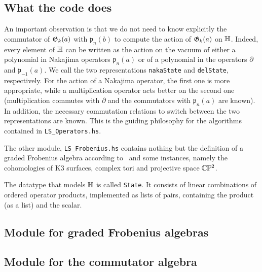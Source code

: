 \subsection{What the code does}
An important observation is that we do not need to know explicitly the commutator of $\mathfrak{G}_k(a)$ with $\mathfrak p_n(b)$ to compute the action of $\mathfrak{G}_k(a)$ on $\mathbb{H}$. 
Indeed, every element of $\mathbb{H}$ can be written as the action on the vacuum of either a polynomial in Nakajima operators $\mathfrak p_n(a)$ or of a polynomial in the operators $\partial$ and $\mathfrak p_{-1}(a)$. We call the two representations \verb|nakaState| and \verb|delState|, respectively. For the action of a Nakajima operator, the first one is more appropriate, while a multiplication operator acts better on the second one (multiplication commutes with $\partial$ and the commutators with $\mathfrak p_n(a)$ are known). 
In addition, the necessary commutation relations to switch between the two representations are known. This is the guiding philosophy for the algorithms contained in \verb|LS_Operators.hs|.

The other module, \verb|LS_Frobenius.hs| contains nothing but the definition of a graded Frobenius algebra according to~\cite[Section 2.1]{LehnSorger} and some instances, namely the cohomologies of K3 surfaces, complex tori and projective space $\mathbb{C}\mathbb P^2$.

The datatype that models $\mathbb{H}$ is called \verb|State|. It consists of linear combinations of ordered operator products, implemented as lists of pairs, containing the product (as a list) and the scalar. 

\subsection{Module for graded Frobenius algebras} 

\subsection{Module for the commutator algebra} 

